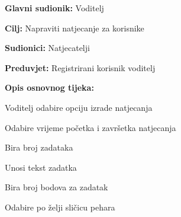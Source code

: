 					
					
						\noindent {}
					\begin{packed_item}
						
						\item \textbf{Glavni sudionik: }Voditelj
						\item  \textbf{Cilj:} Napraviti natjecanje za korisnike 
						\item  \textbf{Sudionici:} Natjecatelji
						\item  \textbf{Preduvjet:} Registrirani korisnik voditelj
						\item  \textbf{Opis osnovnog tijeka:}
						
						\item[] \begin{packed_enum}
							
							\item Voditelj odabire opciju izrade natjecanja
							\item Odabire vrijeme početka i završetka natjecanja
							\item Bira broj zadataka 
							\item Unosi tekst zadatka
							\item Bira broj bodova za zadatak 
							\item Odabire po želji sličicu pehara 
						\end{packed_enum}
					\end{packed_item}
					
